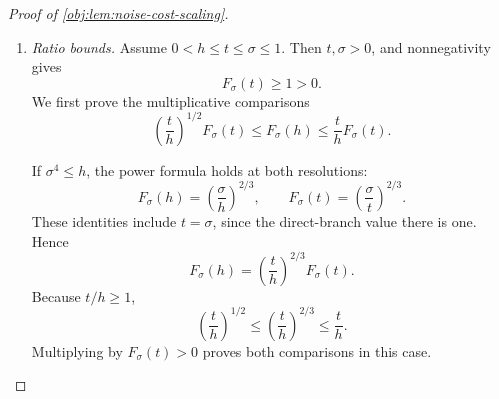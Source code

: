 \documentclass[11pt]{article}
\begin{document}
\begin{proof}[Proof of \cref{obj:lem:noise-cost-scaling}]
\begin{enumerate}
If \(h<\sigma^4\le t\), compare through the interface:
\[
\begin{aligned}
\Psi(t,\sigma)
&=\left(\frac{\sigma}{t}\right)^{2/3}-1\\
&\le\left(\frac{\sigma}{\sigma^4}\right)^{2/3}-1\\
&=(\sigma^4)^{-1/2}
 \left[1+\log\left(\frac{\sigma^2}{\sqrt{\sigma^4}}\right)\right]-1\\
&\le h^{-1/2}
 \left[1+\log\left(\frac{\sigma^2}{\sqrt h}\right)\right]-1
=\Psi(h,\sigma).
\end{aligned}
\]
The first inequality is the power comparison just established, and the equality is the interface identity. For the last inequality,
\[
(\sigma^4)^{-1/2}\le h^{-1/2},
\qquad
0=\log\left(\frac{\sigma^2}{\sqrt{\sigma^4}}\right)
\le\log\left(\frac{\sigma^2}{\sqrt h}\right);
\]
multiplying the corresponding nonnegative factors gives the required bound.

Finally, if \(h\le t<\sigma^4\), then
\[
\sqrt t\le\sigma^2,\qquad
0\le\log\left(\frac{\sigma^2}{\sqrt t}\right)
\le\log\left(\frac{\sigma^2}{\sqrt h}\right),
\qquad
t^{-1/2}\le h^{-1/2}.
\]
Here the logarithmic comparison follows from \(\sqrt h\le\sqrt t\) and monotonicity of the logarithm on positive arguments. Multiplication yields
\[
t^{-1/2}\left[1+\log\left(\frac{\sigma^2}{\sqrt t}\right)\right]-1
\le
h^{-1/2}\left[1+\log\left(\frac{\sigma^2}{\sqrt h}\right)\right]-1.
\]
These cases establish that the cost is nonincreasing.

\item \emph{Ratio bounds.}
Assume \(0<h\le t\le\sigma\le1\). Then \(t,\sigma>0\), and nonnegativity gives
\[
F_\sigma(t)\ge1>0.
\]
We first prove the multiplicative comparisons
\[
\left(\frac th\right)^{1/2}F_\sigma(t)
\le F_\sigma(h)
\le\frac th F_\sigma(t).
\]

If \(\sigma^4\le h\), the power formula holds at both resolutions:
\[
F_\sigma(h)=\left(\frac{\sigma}{h}\right)^{2/3},
\qquad
F_\sigma(t)=\left(\frac{\sigma}{t}\right)^{2/3}.
\]
These identities include \(t=\sigma\), since the direct-branch value there is one. Hence
\[
F_\sigma(h)=\left(\frac th\right)^{2/3}F_\sigma(t).
\]
Because \(t/h\ge1\),
\[
\left(\frac th\right)^{1/2}
\le\left(\frac th\right)^{2/3}
\le\frac th.
\]
Multiplying by \(F_\sigma(t)>0\) proves both comparisons in this case.


\end{enumerate}
\end{proof}
\end{document}
